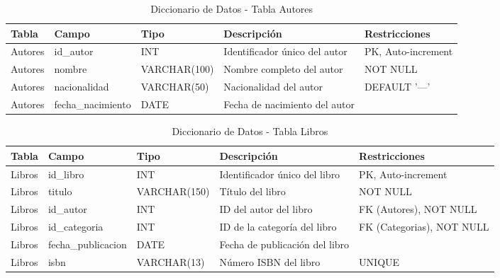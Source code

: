 \documentclass[10pt,a4paper]{article}
\begin{document}
\begin{table}[H]
	\centering
	\hspace*{0pt}
	\begin{tabular}{p{2cm}|p{2.5cm}|>{\raggedright\arraybackslash}p{3cm}|p{4cm}|p{2.5cm}}
		\hline \hline
		\textbf{Tabla} & \textbf{Campo} & \textbf{Tipo} & \textbf{Descripción} & \textbf{Restricciones} \\ \hline \hline
		Autores & id\_autor & INT & Identificador único del autor & PK, Auto-increment \\ \hline
		Autores & nombre & VARCHAR(100) & Nombre completo del autor & NOT NULL \\ \hline
		Autores & nacionalidad & VARCHAR(50) & Nacionalidad del autor & DEFAULT '---' \\ \hline
		Autores & fecha\_nacimiento & DATE & Fecha de nacimiento del autor & \\ \hline
	\end{tabular}
	\caption{Diccionario de Datos - Tabla Autores}
	\label{tab:diccionario_autores}
\end{table}

\begin{table}[H]
	\centering
	\hspace*{0pt}
	\begin{tabular}{p{2cm}|p{2.5cm}|>{\raggedright\arraybackslash}p{3cm}|p{4cm}|p{2.5cm}}
		\hline \hline
		\textbf{Tabla} & \textbf{Campo} & \textbf{Tipo} & \textbf{Descripción} & \textbf{Restricciones} \\ \hline \hline
		Libros & id\_libro & INT & Identificador único del libro & PK, Auto-increment \\ \hline
		Libros & titulo & VARCHAR(150) & Título del libro & NOT NULL \\ \hline
		Libros & id\_autor & INT & ID del autor del libro & FK (Autores), NOT NULL \\ \hline
		Libros & id\_categoria & INT & ID de la categoría del libro & FK (Categorias), NOT NULL \\ \hline
		Libros & fecha\_publicacion & DATE & Fecha de publicación del libro & \\ \hline
		Libros & isbn & VARCHAR(13) & Número ISBN del libro & UNIQUE \\ \hline
	\end{tabular}
	\caption{Diccionario de Datos - Tabla Libros}
	\label{tab:diccionario_libros}
\end{table}
\end{document}
